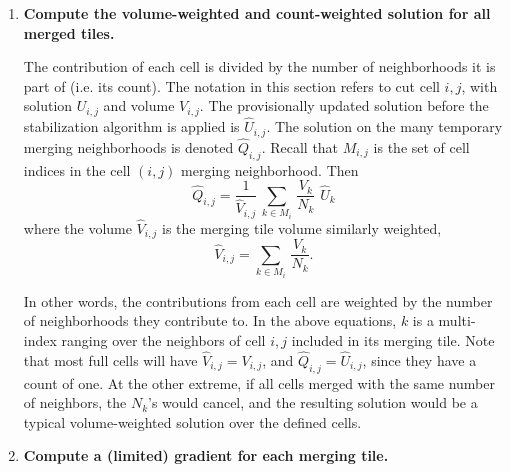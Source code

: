 \begin{enumerate}
\item
{\bf Compute the volume-weighted and count-weighted solution for all
merged tiles.}   

\vspace*{.1in}
The contribution of each cell is divided by the number of neighborhoods 
it is part of (i.e. its count). The notation in this section refers
to cut cell $i,j$, with solution $U_{i,j}$ and volume
$V_{i,j}$. 
The provisionally updated solution before the
stabilization algorithm is applied is $\widehat{U}_{i,j}$.
The solution on the many temporary merging neighborhoods 
is denoted  $\widehat{Q}_{i,j}$. 
Recall that $M_{i,j}$ is the set of cell indices in the cell $(i,j)$ merging
neighborhood.  Then
\begin{equation}
\label{tiledef}
\widehat{Q}_{i,j} =  \frac{1}{{\widehat V}_{i,j}} \, \sum_{k \in M_i} \,  
\frac{V_k}{N_k}  \,\,  \widehat{U}_k
\end{equation}
where the volume ${\widehat V}_{i,j}$ is the merging tile volume similarly weighted,
\begin{equation}
\label{voldef}
{\widehat V}_{i,j} =  \sum_{k \in M_i } \,  \frac{V_k}{N_k}  .
\end{equation}

In other words, the contributions from each cell are weighted by the
number of neighborhoods they contribute to.
In the above equations, $k$ is  a multi-index ranging over the neighbors 
of cell $i,j$ included in its merging tile.
Note that most full cells will have ${\widehat V}_{i,j} = V_{i,j}$, 
and $\widehat{Q}_{i,j}  = \widehat{U}_{i,j}$, since they have a count of one.
At the other extreme, if all cells merged with the same number of neighbors, the $N_k$'s
would cancel, and the resulting solution would be a typical volume-weighted
solution over the defined cells.


\item
{\bf Compute a (limited) gradient for each merging
tile.}


\end{enumerate}
